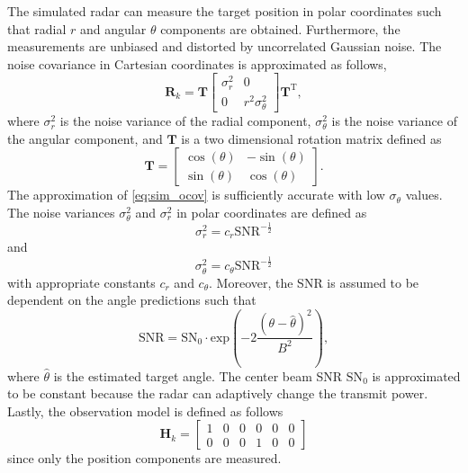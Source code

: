 \documentclass[english, 12pt, a4paper, elec, utf8, a-1b, online]{aaltothesis}
\renewcommand{\vec}[1]{\mathbf{#1}}
\newcommand{\omodel}{\vec{H}_k}
\newcommand{\ocov}{\vec{R}_k}
\newcommand{\SNR}{\text{SNR}}
\newcommand{\SN}{\text{SN}_0}
\renewcommand{\exp}[1]{\text{exp}\left( #1 \right)}
\newcommand{\transpose}[1]{#1^\text{T}}
\newcommand{\rotmat}{\mathbf{T}}
\begin{document}
The simulated radar can measure the target position in polar coordinates such that radial $r$ and angular $\theta$ components are obtained.
Furthermore, the measurements are unbiased and distorted by uncorrelated Gaussian noise.
The noise covariance in Cartesian coordinates is approximated as follows,
\begin{equation} \label{eq:sim_ocov}
    \ocov = \rotmat 
    \left[
        \begin{array}{cc}
            \sigma_r^2 & 0 \\
            0 & r^2 \sigma_\theta^2
        \end{array}
    \right] 
    \transpose{\rotmat},
\end{equation}
where $\sigma_r^2$ is the noise variance of the radial component, $\sigma_\theta^2$ is the noise variance of the angular component, and $\rotmat$ is a two dimensional rotation matrix defined as
\begin{equation}
    \rotmat = \left[
        \begin{array}{cc}
            \cos(\theta) & -\sin(\theta) \\
            \sin(\theta) & \cos(\theta)
        \end{array}
    \right].
\end{equation}
The approximation of \eqref{eq:sim_ocov} is sufficiently accurate with low $\sigma_\theta$ values.
The noise variances $\sigma_\theta^2$ and $\sigma_r^2$ in polar coordinates are defined as
\begin{equation}
    \sigma_r^2 = c_r \SNR^{-\frac{1}{2}}
\end{equation}
and
\begin{equation}
    \sigma_\theta^2 = c_\theta \SNR^{-\frac{1}{2}}
\end{equation}
with appropriate constants $c_r$ and $c_\theta$.
Moreover, the SNR is assumed to be dependent on the angle predictions such that
\begin{equation}
    \SNR = \SN \cdot \exp{ - 2 \frac{\left(\theta - \hat{\theta} \right)^2}{B^2} },
\end{equation}
where $\hat{\theta}$ is the estimated target angle.
The center beam SNR $\SN$ is approximated to be constant because the radar can adaptively change the transmit power.
Lastly, the observation model is defined as follows
\begin{equation}
    \omodel = 
    \left[
        \begin{array}{cccccc}
            1 & 0 & 0 & 0 & 0 & 0 \\
            0 & 0 & 0 & 1 & 0 & 0
        \end{array}
    \right]
\end{equation}
since only the position components are measured.
\end{document}
